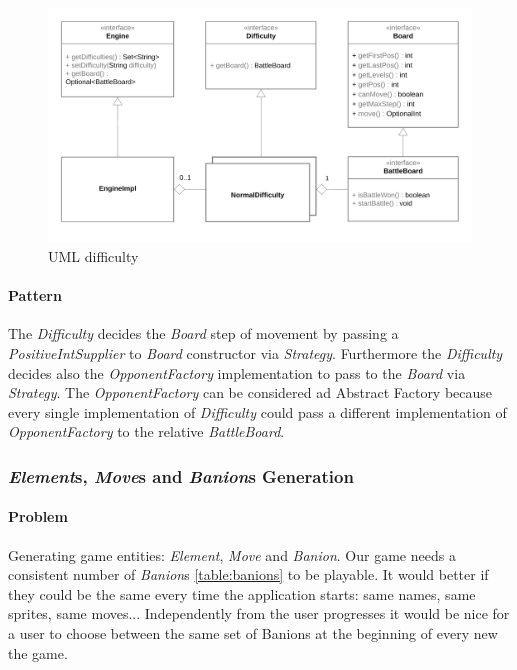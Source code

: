 \documentclass[12pt, a4paper]{report}
\begin{document}
            \begin{figure}[ht]
            \centering{}
            \caption{UML difficulty}
            \includegraphics[width=\textwidth]{difficulty}
            \end{figure}

            \paragraph{Pattern}

            The \emph{Difficulty} decides the \emph{Board} step of movement by passing a \emph{PositiveIntSupplier} to \emph{Board} constructor via \emph{Strategy}.
            Furthermore the \emph{Difficulty} decides also the \emph{OpponentFactory} implementation to pass to the \emph{Board} via \emph{Strategy}.
            The \emph{OpponentFactory} can be considered ad Abstract Factory because every single implementation of \emph{Difficulty} could pass
            a different implementation of \emph{OpponentFactory} to the relative \emph{BattleBoard}.
            
        \pagebreak

        \subsubsection{\emph{Element}s, \emph{Move}s and \emph{Banion}s Generation}

            \paragraph{Problem}
            
            Generating game entities: \emph{Element}, \emph{Move} and \emph{Banion}. Our game needs a consistent number of \emph{Banion}s \ref{table:banions} to be playable.
            It would better if they could be the same every time the application starts: same names, same sprites, same moves...
            Independently from the user progresses it would be nice for a user to choose between the same set of Banions at the beginning of every new the game.
\end{document}
